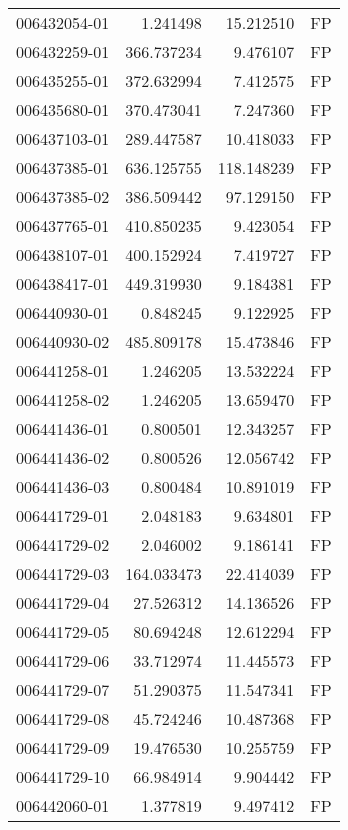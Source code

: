 \begin{tabular}{lrrl}
006432054-01 &    1.241498 &      15.212510 &   FP \\
006432259-01 &  366.737234 &       9.476107 &   FP \\
006435255-01 &  372.632994 &       7.412575 &   FP \\
006435680-01 &  370.473041 &       7.247360 &   FP \\
006437103-01 &  289.447587 &      10.418033 &   FP \\
006437385-01 &  636.125755 &     118.148239 &   FP \\
006437385-02 &  386.509442 &      97.129150 &   FP \\
006437765-01 &  410.850235 &       9.423054 &   FP \\
006438107-01 &  400.152924 &       7.419727 &   FP \\
006438417-01 &  449.319930 &       9.184381 &   FP \\
006440930-01 &    0.848245 &       9.122925 &   FP \\
006440930-02 &  485.809178 &      15.473846 &   FP \\
006441258-01 &    1.246205 &      13.532224 &   FP \\
006441258-02 &    1.246205 &      13.659470 &   FP \\
006441436-01 &    0.800501 &      12.343257 &   FP \\
006441436-02 &    0.800526 &      12.056742 &   FP \\
006441436-03 &    0.800484 &      10.891019 &   FP \\
006441729-01 &    2.048183 &       9.634801 &   FP \\
006441729-02 &    2.046002 &       9.186141 &   FP \\
006441729-03 &  164.033473 &      22.414039 &   FP \\
006441729-04 &   27.526312 &      14.136526 &   FP \\
006441729-05 &   80.694248 &      12.612294 &   FP \\
006441729-06 &   33.712974 &      11.445573 &   FP \\
006441729-07 &   51.290375 &      11.547341 &   FP \\
006441729-08 &   45.724246 &      10.487368 &   FP \\
006441729-09 &   19.476530 &      10.255759 &   FP \\
006441729-10 &   66.984914 &       9.904442 &   FP \\
006442060-01 &    1.377819 &       9.497412 &   FP \\

\end{tabular}
